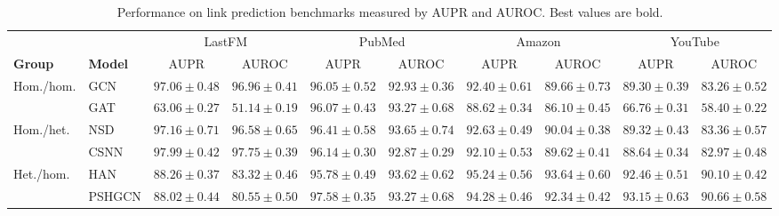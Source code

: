 \documentclass[sigconf,anonymous,review]{acmart}
\begin{document}
\begin{table}[htbp]
  \centering
  \caption{Performance on link prediction benchmarks measured by AUPR and AUROC. Best values are bold.}
  \label{tab:link-pred}
  \scriptsize
  \setlength{\tabcolsep}{2.5pt}
  \resizebox{0.8\textwidth}{!}
  {%
  \begin{tabular}{llcccccccc}
    \toprule
    & & \multicolumn{2}{c}{LastFM} & \multicolumn{2}{c}{PubMed} & \multicolumn{2}{c}{Amazon} & \multicolumn{2}{c}{YouTube} \\
    \cmidrule(lr){3-4}\cmidrule(lr){5-6}\cmidrule(lr){7-8}\cmidrule(lr){9-10}
    \textbf{Group} & \textbf{Model} & AUPR & AUROC & AUPR & AUROC & AUPR & AUROC & AUPR & AUROC \\
    \midrule

    \multirow{2}{*}{Hom./hom.}
    & GCN
    & $97.06 \pm 0.48$ & $96.96 \pm 0.41$
    & $96.05 \pm 0.52$ & $92.93 \pm 0.36$
    & $92.40 \pm 0.61$ & $89.66 \pm 0.73$
    & $89.30 \pm 0.39$ & $83.26 \pm 0.52$ \\
    & GAT
    & $63.06 \pm 0.27$ & $51.14 \pm 0.19$
    & $96.07 \pm 0.43$ & $93.27 \pm 0.68$
    & $88.62 \pm 0.34$ & $86.10 \pm 0.45$
    & $66.76 \pm 0.31$ & $58.40 \pm 0.22$ \\
    \midrule

    \multirow{2}{*}{Hom./het.}
    & NSD
    & $97.16 \pm 0.71$ & $96.58 \pm 0.65$
    & $96.41 \pm 0.58$ & $93.65 \pm 0.74$
    & $92.63 \pm 0.49$ & $90.04 \pm 0.38$
    & $89.32 \pm 0.43$ & $83.36 \pm 0.57$ \\
    & CSNN
    & $97.99 \pm 0.42$ & $97.75 \pm 0.39$
    & $96.14 \pm 0.30$ & $92.87 \pm 0.29$
    & $92.10 \pm 0.53$ & $89.62 \pm 0.41$
    & $88.64 \pm 0.34$ & $82.97 \pm 0.48$ \\
    \midrule

    \multirow{2}{*}{Het./hom.}
    & HAN
    & $88.26 \pm 0.37$ & $83.32 \pm 0.46$
    & $95.78 \pm 0.49$ & $93.62 \pm 0.62$
    & $95.24 \pm 0.56$ & $93.64 \pm 0.60$
    & $92.46 \pm 0.51$ & $90.10 \pm 0.42$ \\
    & PSHGCN
    & $88.02 \pm 0.44$ & $80.55 \pm 0.50$
    & $97.58 \pm 0.35$ & $93.27 \pm 0.68$
    & $94.28 \pm 0.46$ & $92.34 \pm 0.42$
    & $93.15 \pm 0.63$ & $90.66 \pm 0.58$ \\
    \midrule


\end{tabular}}
\end{table}
\end{document}
